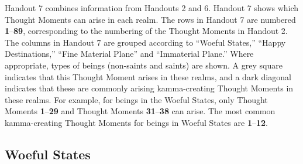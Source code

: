 Handout 7 combines information from Handouts 2 and 6. Handout 7 shows which Thought Moments can arise in each realm. The rows in Handout 7 are numbered \textbf{1}--\textbf{89}, corresponding to the numbering of the Thought Moments in Handout 2. The columns in Handout 7 are grouped according to “Woeful States,” “Happy Destinations,” “Fine Material Plane” and “Immaterial Plane.” Where appropriate, types of beings (non-saints and saints) are shown. A grey square indicates that this Thought Moment arises in these realms, and a dark diagonal indicates that these are commonly arising kamma-creating Thought Moments in these realms. For example, for beings in the Woeful States, only Thought Moments \textbf{1}--\textbf{29} and Thought Moments \textbf{31}--\textbf{38} can arise. The most common kamma-creating Thought Moments for beings in Woeful States are \textbf{1}--\textbf{12}.

\subsection*{Woeful States}

